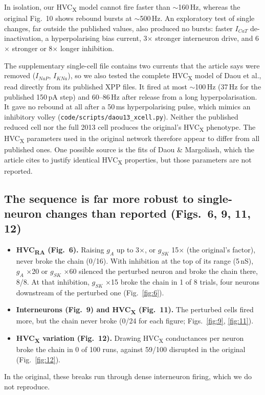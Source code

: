 In isolation, our HVC\textsubscript{X} model cannot fire faster than $\sim$160\,Hz, whereas the
original Fig.~10 shows rebound bursts at $\sim$500\,Hz. An exploratory test of single changes,
far outside the published values, also produced no bursts: faster $I_{CaT}$ de-inactivation, a
hyperpolarising bias current, 3$\times$ stronger interneuron drive, and 6$\times$ stronger or
8$\times$ longer inhibition.

The supplementary single-cell file contains two currents that the article says were removed
($I_{NaP}$, $I_{KNa}$), so we also tested the complete HVC\textsubscript{X} model of Daou et
al.\supercite{Daou2013}, read directly from its published XPP files. It fired at most
$\sim$100\,Hz (37\,Hz for the published 150\,pA step) and 60--86\,Hz after release from a long
hyperpolarisation. It gave no rebound at all after a 50\,ms hyperpolarising pulse, which mimics
an inhibitory volley (\texttt{code/scripts/daou13\_xcell.py}). Neither the published reduced
cell nor the full 2013 cell produces the original's HVC\textsubscript{X} phenotype. The
HVC\textsubscript{X} parameters used in the original network therefore appear to differ from all
published ones. One possible source is the fits of Daou \& Margoliash\supercite{DaouMargoliash2020},
which the article cites to justify identical HVC\textsubscript{X} properties, but those
parameters are not reported.

\subsection*{The sequence is far more robust to single-neuron changes than reported (Figs.~6, 9, 11, 12)}
\begin{itemize}
\item \textbf{HVC\textsubscript{RA} (Fig.~6).} Raising $g_A$ up to 3$\times$, or $g_{SK}$
  15$\times$ (the original's factor), never broke the chain (0/16). With inhibition at the top of
  its range (5\,nS), $g_A$ $\times$20 or $g_{SK}$ $\times$60 silenced the perturbed neuron and
  broke the chain there, 8/8. At that inhibition, $g_{SK}$ $\times$15 broke the chain in 1 of 8
  trials, four neurons downstream of the perturbed one (Fig.~\ref{fig:6}).
\item \textbf{Interneurons (Fig.~9) and HVC\textsubscript{X} (Fig.~11).} The perturbed cells
  fired more, but the chain never broke (0/24 for each figure; Figs.~\ref{fig:9},
  \ref{fig:11}).
\item \textbf{HVC\textsubscript{X} variation (Fig.~12).} Drawing HVC\textsubscript{X}
  conductances per neuron broke the chain in 0 of 100 runs, against 59/100 disrupted in the
  original (Fig.~\ref{fig:12}).
\end{itemize}
In the original, these breaks run through dense interneuron firing, which we do not reproduce.

